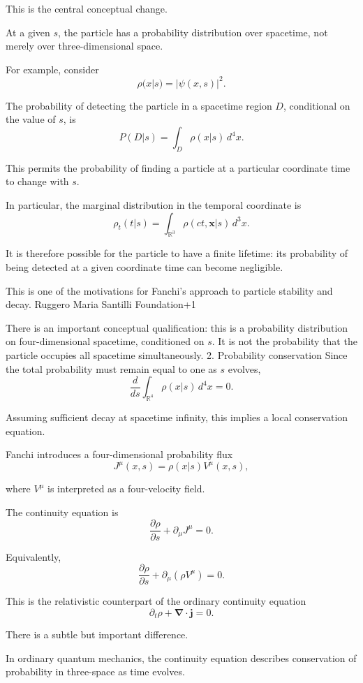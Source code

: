 This is the central conceptual change.

At a given \(s\), the particle has a probability distribution over spacetime, not merely over three-dimensional space.

For example, consider
\[
\rho(x|s)=|\psi(x,s)|^2.
\]

The probability of detecting the particle in a spacetime region \(D\), conditional on the value of \(s\), is
\[
P(D|s)=\int_D \rho(x|s)\,d^4x.
\]

This permits the probability of finding a particle at a particular coordinate time to change with \(s\).

In particular, the marginal distribution in the temporal coordinate is
\[
\rho_t(t|s)=
\int_{\mathbb R^3}\rho(ct,\mathbf x|s)\,d^3x.
\]

It is therefore possible for the particle to have a finite lifetime: its probability of being detected at a given coordinate time can become negligible.

This is one of the motivations for Fanchi's approach to particle stability and decay. 
Ruggero Maria Santilli Foundation+1


There is an important conceptual qualification: this is a probability distribution on four-dimensional spacetime, conditioned on \(s\). It is not the probability that the particle occupies all spacetime simultaneously.
2. Probability conservation
Since the total probability must remain equal to one as \(s\) evolves,
\[
\frac{d}{ds}\int_{\mathbb R^4}\rho(x|s)\,d^4x=0.
\]

Assuming sufficient decay at spacetime infinity, this implies a local conservation equation.

Fanchi introduces a four-dimensional probability flux
\[
J^\mu(x,s)=\rho(x|s)V^\mu(x,s),
\]

where \(V^\mu\) is interpreted as a four-velocity field.

The continuity equation is
\[
\boxed{
\frac{\partial\rho}{\partial s}
+
\partial_\mu J^\mu=0.
}
\tag{2}
\]

Equivalently,
\[
\boxed{
\frac{\partial\rho}{\partial s}
+
\partial_\mu(\rho V^\mu)=0.
}
\tag{3}
\]

This is the relativistic counterpart of the ordinary continuity equation
\[
\partial_t\rho+\boldsymbol\nabla\cdot\mathbf j=0.
\]

There is a subtle but important difference.

In ordinary quantum mechanics, the continuity equation describes conservation of probability in three-space as time evolves.

